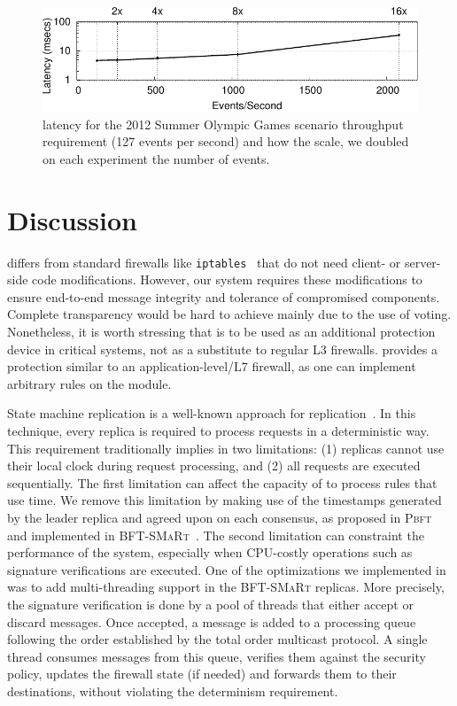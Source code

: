 \begin{figure}[!h]
\centering
\includegraphics[width=\columnwidth]{images/gnuplot/sieveq/new_massif/massif.pdf}
\caption{\sieveq latency for the 2012 Summer Olympic Games scenario throughput requirement (127 events per second) and how the \sieveq scale, we doubled on each experiment the number of events.}
\label{fig:massif}
\end{figure}

\section{Discussion}
\label{discussion}

\sieveq differs from standard firewalls like \texttt{iptables}~\cite{iptables} that do not need client- or server-side code modifications.
However, our system requires these modifications to ensure end-to-end message integrity and tolerance of compromised components.
Complete transparency would be hard to achieve mainly due to the use of voting.
Nonetheless, it is worth stressing that \sieveq is to be used as an additional protection device in critical systems, not as a substitute to regular L3 firewalls.
\sieveq provides a protection similar to an application-level/L7 firewall, as one can implement arbitrary rules on the \repsieve module.


State machine replication is a well-known approach for replication~\cite{Schneider:1990}.
In this technique, every replica is required to process requests in a deterministic way.
This requirement traditionally implies in two limitations: (1) replicas cannot use their local clock during request processing, and (2) all requests are executed sequentially.
The first limitation can affect the capacity of \sieveq to process rules that use time.
We remove this limitation by making use of the timestamps generated by the leader replica and agreed upon on each consensus, as proposed in \textsc{Pbft}~\cite{Castro:2002} and implemented in \textsc{BFT-SMaRt}~\cite{Bessani:2014}.
The second limitation can constraint the performance of the system, especially when CPU-costly operations such as signature verifications are executed.
One of the optimizations we implemented in \sieveq was to add multi-threading support in the \textsc{BFT-SMaRt} replicas.
More precisely, the signature verification is done by a pool of threads that either accept or discard messages.
Once accepted, a message is added to a processing queue following the order established by the total order multicast protocol.
A single thread consumes messages from this queue, verifies them against the security policy, updates the firewall state (if needed) and forwards them to their destinations, without violating the determinism requirement.



